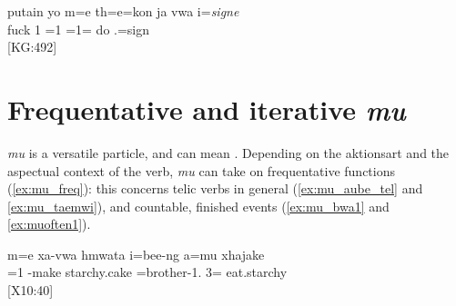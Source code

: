 \ea \label{ex:konja}
\gll putain yo m=e th=e=kon ja vwa i=\textit{signe}\\
 fuck 1 =1 =1=  do .=sign\\
\glt {} {[KG:492]}
\z 
%
%
%
%
% 
%
% 
% 
 
 \section{Frequentative and iterative \textit{mu}}
  \label{sec:mu}	
 \textit{mu} is a versatile particle, and can mean . Depending on the aktionsart and the aspectual context of the verb, \textit{mu} can take on frequentative functions (\ref{ex:mu_freq}): this concerns telic verbs in general (\ref{ex:mu_aube_tel} and \ref{ex:mu_taemwi}), and countable, finished events (\ref{ex:mu_bwa1} and \ref{ex:muoften1}).%
 
 \ea\label{ex:mu_aube_tel}\label{ex:mu_freq}
 \gll m=e xa-vwa hmwata i=bee-ng a=mu xhajake\\
  =1 -make starchy.cake =brother-1. 3= eat.starchy\\
 \glt {} {[X10:40]}
  \z
 
